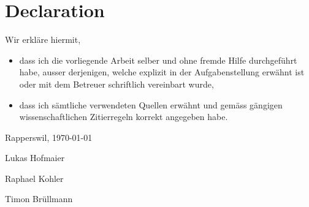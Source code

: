 \chapter*{Declaration}
\label{cha:declaration}


Wir erkläre hiermit,
\begin{itemize}
\item dass ich die vorliegende Arbeit selber und ohne fremde Hilfe durchgeführt habe, ausser derjenigen, welche explizit in der Aufgabenstellung erwähnt ist oder mit dem Betreuer schriftlich vereinbart wurde,
\item dass ich sämtliche verwendeten Quellen erwähnt und gemäss gängigen wissenschaftlichen Zitierregeln korrekt angegeben habe.
\end{itemize}

\vspace{1.5cm}

\noindent
Rapperswil, \today

\vspace{2cm}

\noindent

\noindent
Lukas Hofmaier


\vspace{2cm}

\noindent

\noindent
Raphael Kohler


\vspace{2cm}

\noindent

\noindent
Timon Brüllmann